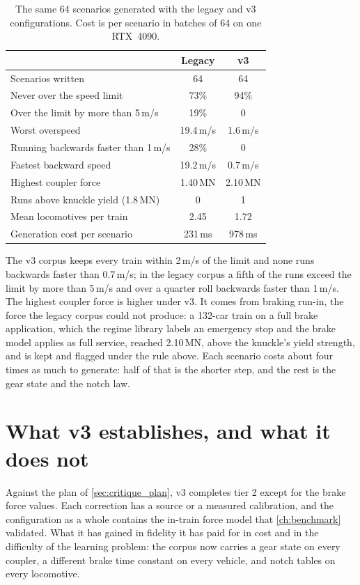 \begin{table}[htbp]
    \centering
    \small
    \begin{tabular}{lcc}
        \toprule
        & Legacy & v3 \\
        \midrule
        Scenarios written & 64 & 64 \\
        Never over the speed limit & 73\% & 94\% \\
        Over the limit by more than 5\,m/s & 19\% & 0 \\
        Worst overspeed & 19.4\,m/s & 1.6\,m/s \\
        Running backwards faster than 1\,m/s & 28\% & 0 \\
        Fastest backward speed & 19.2\,m/s & 0.7\,m/s \\
        Highest coupler force & 1.40\,MN & 2.10\,MN \\
        Runs above knuckle yield (1.8\,MN) & 0 & 1 \\
        Mean locomotives per train & 2.45 & 1.72 \\
        Generation cost per scenario & 231\,ms & 978\,ms \\
        \bottomrule
    \end{tabular}
    \caption{The same 64 scenarios generated with the legacy and v3 configurations. Cost is per scenario in batches of 64 on one RTX~4090.}
    \label{tab:v3_smoke}
\end{table}

The v3 corpus keeps every train within 2\,m/s of the limit and none runs backwards faster than 0.7\,m/s; in the legacy corpus a fifth of the runs exceed the limit by more than 5\,m/s and over a quarter roll backwards faster than 1\,m/s. The highest coupler force is higher under v3. It comes from braking run-in, the force the legacy corpus could not produce: a 132-car train on a full brake application, which the regime library labels an emergency stop and the brake model applies as full service, reached 2.10\,MN, above the knuckle's yield strength, and is kept and flagged under the rule above. Each scenario costs about four times as much to generate: half of that is the shorter step, and the rest is the gear state and the notch law.

\section{What v3 establishes, and what it does not}
\label{sec:v3_scope}

Against the plan of \cref{sec:critique_plan}, v3 completes tier 2 except for the brake force values. Each correction has a source or a measured calibration, and the configuration as a whole contains the in-train force model that \cref{ch:benchmark} validated. What it has gained in fidelity it has paid for in cost and in the difficulty of the learning problem: the corpus now carries a gear state on every coupler, a different brake time constant on every vehicle, and notch tables on every locomotive.

